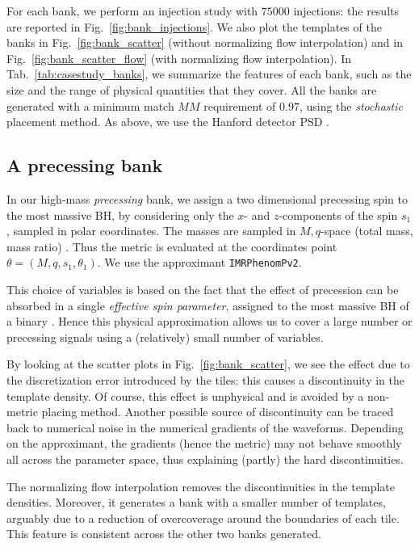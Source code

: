 \documentclass[twocolumn,showpacs,preprintnumbers,nofootinbib,prd,
superscriptaddress,10pt]{revtex4-2}
\begin{document}
For each bank, we perform an injection study with $75000$ injections: the results are reported in Fig.~\ref{fig:bank_injections}. We also plot the templates of the banks in Fig.~\ref{fig:bank_scatter} (without normalizing flow interpolation) and in Fig.~\ref{fig:bank_scatter_flow} (with normalizing flow interpolation).
In Tab.~\ref{tab:casestudy_banks}, we summarize the features of each bank, such as the size and the range of physical quantities that they cover.
All the banks are generated with a minimum match $MM$ requirement of $0.97$, using the {\it stochastic} placement method.
As above, we use the Hanford detector PSD \cite{O3a_PSDs}.

\subsection{A precessing bank}\label{sec:precessing_bank}
	
In our high-mass {\it precessing} bank, we assign a two dimensional precessing spin to the most massive BH, by considering only the $x$- and $z$-components of the spin $s_1$, sampled in polar coordinates. The masses are sampled in $M,q$-space (total mass, mass ratio) .  Thus the metric is evaluated at the coordinates point $\theta = (M, q, s_1, \theta_1)$. We use the approximant \texttt{IMRPhenomPv2}.

This choice of variables is based on the fact that the effect of precession can be absorbed in a single {\it effective spin parameter}, assigned to the most massive BH of a binary \cite{PhysRevD.91.024043, PhysRevD.103.083022}. Hence this physical approximation allows us to cover a large number or precessing signals using a (relatively) small number of variables.

By looking at the scatter plots in Fig.~\ref{fig:bank_scatter}, we see the effect due to the discretization error introduced by the tiles: this causes a discontinuity in the template density. Of course, this effect is unphysical and is avoided by a non-metric placing method.
Another possible source of discontinuity can be traced back to numerical noise in the numerical gradients of the waveforms. Depending on the approximant, the gradients (hence the metric) may not behave smoothly all across the parameter space, thus explaining (partly) the hard discontinuities.

The normalizing flow interpolation removes the discontinuities in the template densities. Moreover, it generates a bank with a smaller number of templates, arguably due to a reduction of overcoverage around the boundaries of each tile. This feature is consistent across the other two banks generated.
\end{document}
